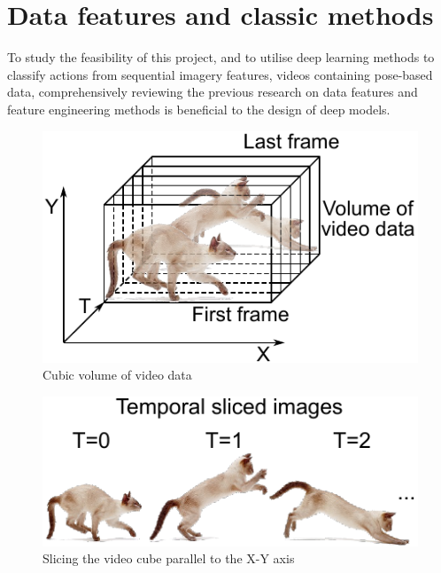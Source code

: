 \section{Data features and classic methods}
\label{sec:Data features and classic methods}
To study the feasibility of this project, and to utilise deep learning methods to classify actions from sequential imagery features, videos containing pose-based data, comprehensively reviewing the previous research on data features and feature engineering methods is beneficial to the design of deep models.

\begin{minipage}[ht]{.48\textwidth}
    \begin{figure}[H]
        \centering
        \includegraphics[scale=0.9]{literature/imgs/1-video-volume.pdf}
        \caption{Cubic volume of video data}
        \label{fig:1-video-volume}
    \end{figure}
\end{minipage}
\begin{minipage}[ht]{.5\textwidth}
    \begin{figure}[H]
        \centering
        \includegraphics{literature/imgs/2-video-slice.pdf}
        \caption{Slicing the video cube parallel to the X-Y axis}
        \label{fig:2-video-slice}
    \end{figure}
\end{minipage}

